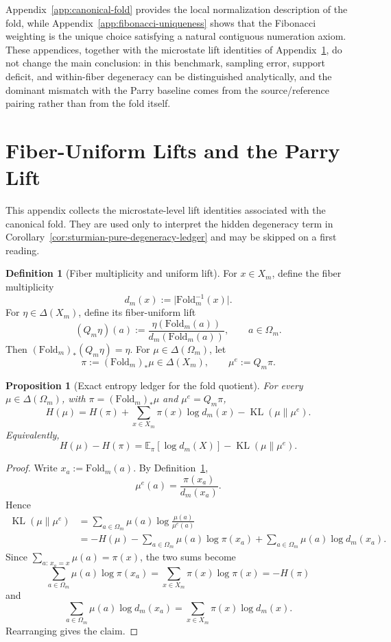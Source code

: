 \documentclass[11pt,letterpaper]{article}
\numberwithin{equation}{section}
\theoremstyle{plain}
\newtheorem{proposition}[theorem]{Proposition}
\theoremstyle{definition}
\newtheorem{definition}[theorem]{Definition}
\theoremstyle{remark}
\newcommand{\Fold}{\mathrm{Fold}}
\DeclareMathOperator{\KL}{KL}
\begin{document}
Appendix~\ref{app:canonical-fold} provides the local normalization description
of the fold, while Appendix~\ref{app:fibonacci-uniqueness} shows that the
Fibonacci weighting is the unique choice satisfying a natural contiguous
numeration axiom. These appendices, together with the microstate lift
identities of Appendix~\ref{app:fiber-lift}, do not change the main
conclusion: in this benchmark, sampling error, support deficit, and
within-fiber degeneracy can be distinguished analytically, and the dominant
mismatch with the Parry baseline comes from the source/reference pairing
rather than from the fold itself.

\appendix

\section{Fiber-Uniform Lifts and the Parry Lift}\label{app:fiber-lift}

This appendix collects the microstate-level lift identities associated with the
canonical fold. They are used only to interpret the hidden degeneracy term in
Corollary~\ref{cor:sturmian-pure-degeneracy-ledger} and may be skipped on a
first reading.

\begin{definition}[Fiber multiplicity and uniform lift]\label{def:fiber-uniform-lift}
For \(x\in X_m\), define the fiber multiplicity
\[
d_m(x):=\bigl|\Fold_m^{-1}(x)\bigr|.
\]
For \(\eta\in\Delta(X_m)\), define its fiber-uniform lift
\[
(Q_m\eta)(a):=\frac{\eta(\Fold_m(a))}{d_m(\Fold_m(a))},
\qquad a\in\Omega_m.
\]
Then \((\Fold_m)_*(Q_m\eta)=\eta\). For \(\mu\in\Delta(\Omega_m)\), let
\[
\pi:=(\Fold_m)_*\mu\in\Delta(X_m),
\qquad
\mu^e:=Q_m\pi.
\]
\end{definition}

\begin{proposition}[Exact entropy ledger for the fold quotient]\label{prop:fold-entropy-ledger}
For every \(\mu\in\Delta(\Omega_m)\), with \(\pi=(\Fold_m)_*\mu\) and
\(\mu^e=Q_m\pi\),
\[
H(\mu)
=
H(\pi)+\sum_{x\in X_m}\pi(x)\log d_m(x)-\KL(\mu\|\mu^e).
\]
Equivalently,
\[
H(\mu)-H(\pi)
=
\mathbb{E}_{\pi}[\log d_m(X)]-\KL(\mu\|\mu^e).
\]
\end{proposition}

\begin{proof}
Write \(x_a:=\Fold_m(a)\). By Definition~\ref{def:fiber-uniform-lift},
\[
\mu^e(a)=\frac{\pi(x_a)}{d_m(x_a)}.
\]
Hence
\[
\begin{aligned}
\KL(\mu\|\mu^e)
&=
\sum_{a\in\Omega_m}\mu(a)\log\frac{\mu(a)}{\mu^e(a)}\\
&=
-H(\mu)-\sum_{a\in\Omega_m}\mu(a)\log\pi(x_a)
+\sum_{a\in\Omega_m}\mu(a)\log d_m(x_a).
\end{aligned}
\]
Since \(\sum_{a:\,x_a=x}\mu(a)=\pi(x)\), the two sums become
\[
\sum_{a\in\Omega_m}\mu(a)\log\pi(x_a)=\sum_{x\in X_m}\pi(x)\log\pi(x)=-H(\pi)
\]
and
\[
\sum_{a\in\Omega_m}\mu(a)\log d_m(x_a)
=
\sum_{x\in X_m}\pi(x)\log d_m(x).
\]
Rearranging gives the claim.
\end{proof}
\end{document}
